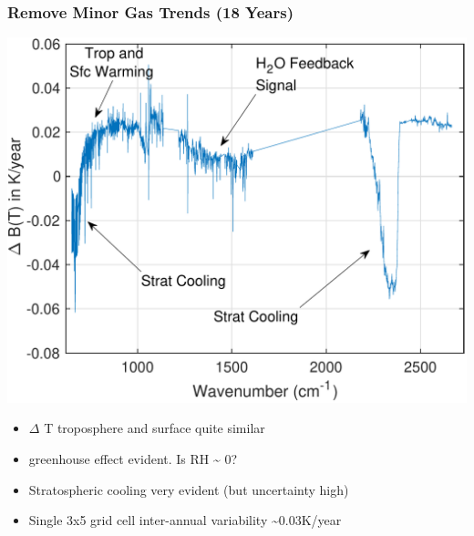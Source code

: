 \documentclass[10pt,t]{beamer}
\begin{document}
\begin{frame}
\frametitle{Remove Minor Gas Trends (18 Years)}
\vspace{-0.1in}

\begin{center}
\includegraphics[width=0.7\linewidth]{./Figslls/global18year_forcing_removed.pdf}
\end{center}

\vspace{-0.15in}
\begin{small}
\begin{itemize}
\item \(\Delta\) T troposphere and surface quite similar
\item \water greenhouse effect evident.  Is RH \textasciitilde{} 0?
\item Stratospheric cooling very evident (but uncertainty high)
\item Single 3x5 grid cell inter-annual variability \textasciitilde{}0.03K/year
\end{itemize}
\end{small}
\end{frame}
\end{document}
